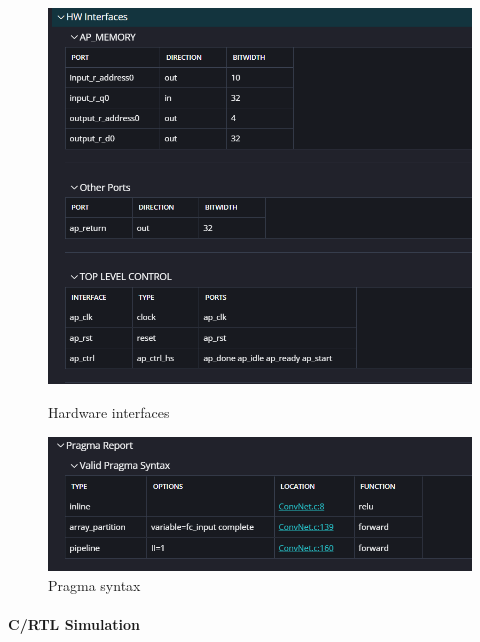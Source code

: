 \documentclass{article}
\begin{document}
\begin{figure}[H]
    \centering
    \begin{minipage}{0.49\textwidth}
        \centering
        \includegraphics[width=1\textwidth]{./assets/ConvNet/c-synthesis-HWinterfaces.png}
        \caption{Hardware interfaces}
        \label{fig:convnet-c-synthesis-hw-interfaces}
    \end{minipage}
    \hfill
    \begin{minipage}{0.49\textwidth}
        \centering
        \includegraphics[width=1\textwidth]{./assets/ConvNet/c-synthesis-validpragmasyntax.png}
        \caption{Pragma syntax}
        \label{fig:convnet-c-synthesis-pragma-syntax}
    \end{minipage}
\end{figure}


\paragraph{C/RTL Simulation}
\end{document}

